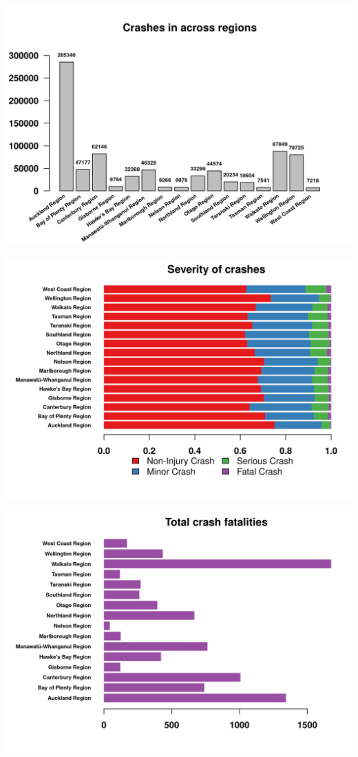 \documentclass[xcolor=dvipsnames,xcolor=table, 14p]{beamer}
\begin{document}
\begin{frame}
    \centering
    \includegraphics[width=1\textwidth]{figures/location2-1.png}
\end{frame}

\begin{frame}
    \centering
    \includegraphics[width=1\textwidth]{figures/regions-1.png}
\end{frame}

\begin{frame}
    \centering
    \includegraphics[width=1\textwidth]{figures/regions2-1.png}
\end{frame}
\end{document}
